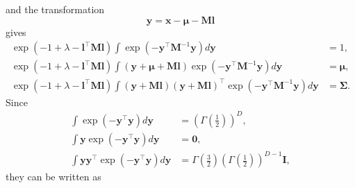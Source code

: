 %
and the transformation 
%
\begin{equation}
\mathbf{y} 
= 
\mathbf{x} 
- 
\bm{\mu} 
- 
\mathbf{M} 
\mathbf{l}
\end{equation}
%
gives
%
\begin{equation}
\begin{aligned}
\exp 
\left( 
	- 
	1 
	+ 
	\lambda
	- 
	\mathbf{l} ^ \intercal 
	\mathbf{M} 
	\mathbf{l} 
\right) 
\int 
\exp 
\left( 
	- 
	\mathbf{y} ^ \intercal 
	\mathbf{M} ^ {- 1} 
	\mathbf{y} 
\right) 
d\mathbf{y} 
&= 
1, 
\\
\exp 
\left( 
	- 
	1 
	+ 
	\lambda
	- 
	\mathbf{l} ^ \intercal 
	\mathbf{M} 
	\mathbf{l} 
\right) 
\int 
\left( 
	\mathbf{y} 
	+ 
	\bm{\mu} 
	+ 
	\mathbf{M} 
	\mathbf{l} 
\right) 
\exp 
\left( 
	- 
	\mathbf{y} ^ \intercal 
	\mathbf{M} ^ {- 1} 
	\mathbf{y} 
\right) 
d\mathbf{y} 
&= 
\bm{\mu}, 
\\
\exp 
\left( 
	- 
	1 
	+ 
	\lambda
	- 
	\mathbf{l} ^ \intercal 
	\mathbf{M} 
	\mathbf{l} 
\right) 
\int 
\left( 
	\mathbf{y} 
	+ 
	\mathbf{M} 
	\mathbf{l} 
\right) 
\left( 
	\mathbf{y} 
	+ 
	\mathbf{M} 
	\mathbf{l} 
\right) ^ \intercal
\exp 
\left( 
	- 
	\mathbf{y} ^ \intercal 
	\mathbf{M} ^ {- 1}
	\mathbf{y} 
\right) 
d\mathbf{y} 
&= 
\bm{\Sigma}.
\end{aligned}
\end{equation}
%
Since
%
\begin{equation}
\begin{aligned}
\int 
\exp 
\left( 
	- 
	\mathbf{y} ^ \intercal 
	\mathbf{y} 
\right) 
d\mathbf{y} 
&= 
\left( 
	\Gamma 
	\left( 
		\frac{1}{2} 
	\right) 
\right) ^ D, \\
\int 
\mathbf{y} 
\exp 
\left( 
	- 
	\mathbf{y} ^ \intercal 
	\mathbf{y} 
\right) 
d\mathbf{y} 
&= 
\mathbf{0}, 
\\
\int 
\mathbf{y} 
\mathbf{y} ^ \intercal 
\exp 
\left( 
	- 
	\mathbf{y} ^ \intercal 
	\mathbf{y} 
\right) 
d\mathbf{y}
&= 
\Gamma 
\left( 
	\frac{3}{2} 
\right) 
\left( 
	\Gamma 
	\left( 
		\frac{1}{2}
	\right) 
\right) ^ {D - 1} 
\mathbf{I},
\end{aligned}
\end{equation}
%
they can  be written as
%
